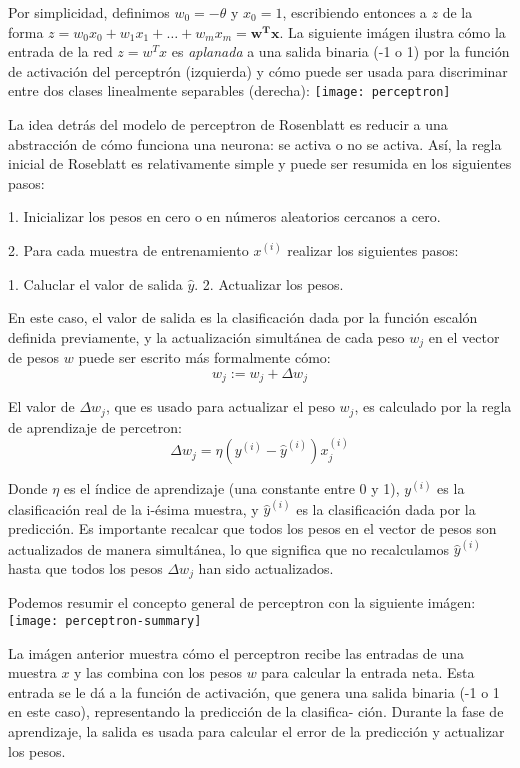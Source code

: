 Por simplicidad, definimos $w_0=-\theta$ y $x_0=1$, escribiendo entonces a $z$ de la
forma $z=w_0x_0 + w_1x_1 + \dots + w_mx_m = \mathbf{w^Tx}$.
La siguiente imágen ilustra cómo la entrada de la red $z=w^Tx$ es \textit{aplanada}
a una salida binaria (-1 o 1) por la función de activación del perceptrón (izquierda)
y cómo puede ser usada para discriminar entre dos clases linealmente separables (derecha):
\texttt{[image: perceptron]}\cite{python}

La idea detrás del modelo de perceptron de Rosenblatt es reducir a una abstracción de cómo funciona
una neurona: se activa o no se activa. Así, la regla inicial de Roseblatt es relativamente
simple y puede ser resumida en los siguientes pasos:

1. Inicializar los pesos en cero o en números aleatorios cercanos a cero.

2. Para cada muestra de entrenamiento $x^{(i)}$ realizar los siguientes pasos:

1. Caluclar el valor de salida $\hat y$.
2. Actualizar los pesos.


En este caso, el valor de salida es la clasificación dada por la función escalón
definida previamente, y la actualización simultánea de cada peso $w_j$ en el
vector de pesos $w$ puede ser escrito más formalmente cómo:
\begin{equation}
  w_j := w_j + \Delta w_j
\end{equation}

El valor de $\Delta w_j$, que es usado para actualizar el peso $w_j$, es
calculado por la regla de aprendizaje de percetron:
\begin{equation}
  \Delta w_j = \eta (y^{(i)} - \hat y^{(i)})x^{(i)}_j
\end{equation}

Donde $\eta$ es el índice de aprendizaje (una constante entre 0 y 1),
$y^{(i)}$ es la clasificación real de la i-ésima muestra, y $\hat y^{(i)}$
es la clasificación dada por la predicción. Es importante recalcar que
todos los pesos en el vector de pesos son actualizados de manera
simultánea, lo que significa que no recalculamos $\hat y^{(i)}$ hasta que
todos los pesos $\Delta w_j$ han sido actualizados.

Podemos resumir el concepto general de perceptron con la siguiente imágen:
\texttt{[image: perceptron-summary]}\cite{python}

La imágen anterior muestra cómo el perceptron recibe las entradas de una
muestra $x$ y las combina con los pesos $w$ para calcular la entrada neta.
Esta entrada se le dá a la función de activación, que genera una salida
binaria (-1 o 1 en este caso), representando la predicción de la clasifica-
ción. Durante la fase de aprendizaje, la salida es usada para calcular el
error de la predicción y actualizar los pesos.
